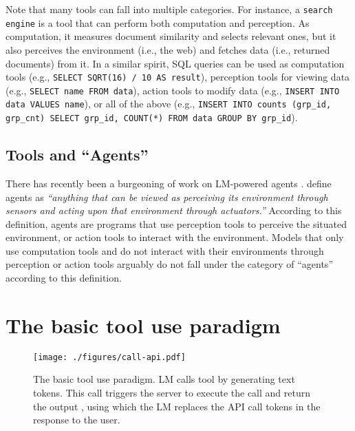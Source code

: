Note that many tools can fall into multiple categories.
For instance, a \texttt{search engine} is a tool that can perform both computation and perception.
As computation, it measures document similarity and selects relevant ones, but it also perceives the environment (i.e., the web) and fetches data (i.e., returned documents) from it.
In a similar spirit, \textsc{SQL} queries can be used as computation tools (e.g., \texttt{SELECT SQRT(16) / 10 AS result}), perception tools for viewing data (e.g., \texttt{SELECT name FROM data}), action tools to modify data (e.g., \texttt{INSERT INTO data VALUES name}), or all of the above (e.g., \texttt{INSERT INTO counts (grp\_id, grp\_cnt) SELECT grp\_id, COUNT(*) FROM data GROUP BY grp\_id}).

\subsection{Tools and ``Agents''} 
There has recently been a burgeoning of work on LM-powered agents \citep{xi2023rise,sumers2024cognitive}.
\citet{russell2010artificial} define agents as \textit{``anything that can be viewed as perceiving its environment through sensors and acting upon that environment through actuators.''}
According to this definition, agents are programs that use perception tools to perceive the situated environment, or action tools to interact with the environment.
Models that only use computation tools and do not interact with their environments through perception or action tools arguably do not fall under the category of ``agents'' according to this definition.



\section{The basic tool use paradigm}
\label{sec:basic-paradigm}
\begin{wrapfigure}[16]{r}{0.42\textwidth}
\vspace{-5mm}
\texttt{[image: ./figures/call-api.pdf]}
\vspace{-2mm}
\caption{The basic tool use paradigm. LM calls  tool by generating text tokens. This call triggers the server to execute the call and return the output , using which the LM replaces the API call tokens in the response to the user.}
\label{fig:call-api}
\end{wrapfigure}

